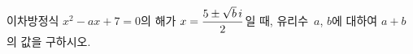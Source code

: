 이차방정식 $x^2-ax+7=0$의 해가 $x=\dfrac{5\pm\sqrt{b}\mkern3mu i}{2}$일 때, 유리수~$a$, $b$에 대하여 $a+b$의 값을 구하시오.
